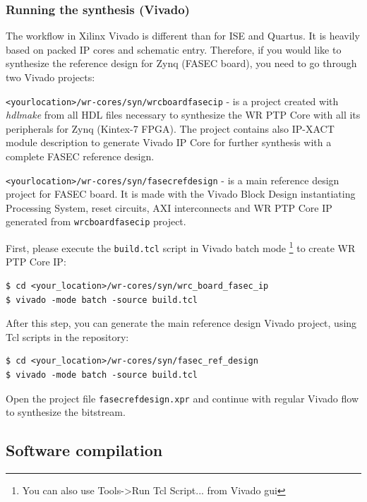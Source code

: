 \documentclass[a4paper, 12pt]{article}
\renewcommand{\_}{\underscore\allowbreak}
\begin{document}
\subsubsection{Running the synthesis (Vivado)}
The workflow in Xilinx Vivado is different than for ISE and Quartus. It is
heavily based on packed IP cores and schematic entry. Therefore, if you would
like to synthesize the reference design for Zynq (FASEC board), you
need to go through two Vivado projects:
\begin{itemize*}
  \item \texttt{<your\_location>/wr-cores/syn/wrc\_board\_fasec\_ip} - is a
    project created with \textit{hdlmake} from all HDL files necessary to
    synthesize the WR PTP Core with all its peripherals for Zynq (Kintex-7 FPGA).
    The project contains also IP-XACT module description to generate Vivado IP
    Core for further synthesis with a complete FASEC reference design.
  \item \texttt{<your\_location>/wr-cores/syn/fasec\_ref\_design} - is a main
    reference design project for FASEC board. It is made with the Vivado Block
    Design instantiating Processing System, reset circuits, AXI interconnects
    and WR PTP Core IP generated from \texttt{wrc\_board\_fasec\_ip} project.
\end{itemize*}

First, please execute the \texttt{build.tcl} script in Vivado batch mode
\footnote{You can also use Tools->Run Tcl Script... from Vivado gui} to create
WR PTP Core IP:
\begin{lstlisting}
$ cd <your_location>/wr-cores/syn/wrc_board_fasec_ip
$ vivado -mode batch -source build.tcl
\end{lstlisting}

After this step, you can generate the main reference design Vivado project,
using Tcl scripts in the repository:
\begin{lstlisting}
$ cd <your_location>/wr-cores/syn/fasec_ref_design
$ vivado -mode batch -source build.tcl
\end{lstlisting}

Open the project file \texttt{fasec\_ref\_design.xpr} and continue with regular
Vivado flow to synthesize the bitstream.

\subsection{Software compilation}
\label{Software compilation}
\end{document}
